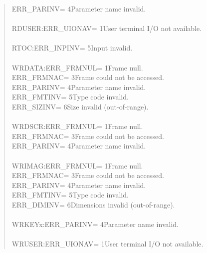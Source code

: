 \documentclass{article}
\begin{document}
\begin{quote}
\begin{tabbing}
\>ERR\_PARINV\>= 4\>Parameter name invalid.\\
\\
RDUSER:\>ERR\_UIONAV\>= 1\>User terminal I/O not available.\\
\\
RTOC:\>ERR\_INPINV\>= 5\>Input invalid.\\
\\
WRDATA:\>ERR\_FRMNUL\>= 1\>Frame null.\\
\>ERR\_FRMNAC\>= 3\>Frame could not be accessed.\\
\>ERR\_PARINV\>= 4\>Parameter name invalid.\\
\>ERR\_FMTINV\>= 5\>Type code invalid.\\
\>ERR\_SIZINV\>= 6\>Size invalid (out-of-range).\\
\\
WRDSCR:\>ERR\_FRMNUL\>= 1\>Frame null.\\
\>ERR\_FRMNAC\>= 3\>Frame could not be accessed.\\
\>ERR\_PARINV\>= 4\>Parameter name invalid.\\
\\
WRIMAG:\>ERR\_FRMNUL\>= 1\>Frame null.\\
\>ERR\_FRMNAC\>= 3\>Frame could not be accessed.\\
\>ERR\_PARINV\>= 4\>Parameter name invalid.\\
\>ERR\_FMTINV\>= 5\>Type code invalid.\\
\>ERR\_DIMINV\>= 6\>Dimensions invalid (out-of-range).\\
\\
WRKEYx:\>ERR\_PARINV\>= 4\>Parameter name invalid.\\
\\
WRUSER:\>ERR\_UIONAV\>= 1\>User terminal I/O not available.
\end{tabbing}
\end{quote}
\end{document}
